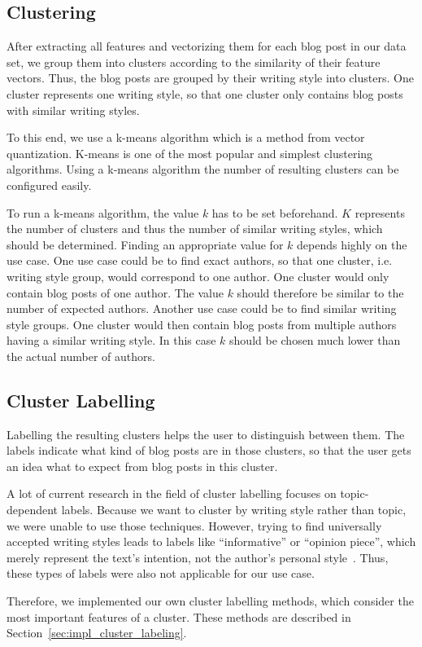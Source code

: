 
\subsection{Clustering}
\label{sec:clustering}

After extracting all features and vectorizing them for each blog post in our data set, we group them into clusters according to the similarity of their feature vectors.
Thus, the blog posts are grouped by their writing style into clusters.
One cluster represents one writing style, so that one cluster only contains blog posts with similar writing styles.


To this end, we use a k-means algorithm which is a method from vector quantization.
K-means is one of the most popular and simplest clustering algorithms.
Using a k-means algorithm the number of resulting clusters can be configured easily.


To run a k-means algorithm, the value $k$ has to be set beforehand.
$K$ represents the number of clusters and thus the number of similar writing styles, which should be determined.
Finding an appropriate value for $k$ depends highly on the use case.
One use case could be to find exact authors, so that one cluster, i.e. writing style group, would correspond to one author.
One cluster would only contain blog posts of one author.
The value $k$ should therefore be similar to the number of expected authors.
Another use case could be to find similar writing style groups.
One cluster would then contain blog posts from multiple authors having a similar writing style.
In this case $k$ should be chosen much lower than the actual number of authors.




\subsection{Cluster Labelling}
\label{sec:cluster_labeling}

Labelling the resulting clusters helps the user to distinguish between them.
The labels indicate what kind of blog posts are in those clusters, so that the user gets an idea what to expect from blog posts in this cluster.


A lot of current research in the field of cluster labelling focuses on topic-dependent labels.
Because we want to cluster by writing style rather than topic, we were unable to use those techniques.
However, trying to find universally accepted writing styles leads to labels like ``informative'' or ``opinion piece'', which merely represent the text's intention, not the author's personal style~\cite{lee2001genres}.
Thus, these types of labels were also not applicable for our use case.


Therefore, we implemented our own cluster labelling methods, which consider the most important features of a cluster.
These methods are described in Section~\ref{sec:impl_cluster_labeling}.